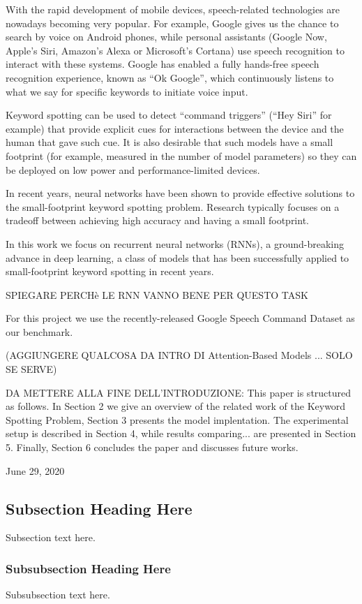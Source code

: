 \documentclass[conference]{IEEEtran}
\begin{document}
With the rapid development of mobile devices, speech-related technologies are nowadays becoming very popular. For example, Google gives us the chance to search by voice on Android phones, while personal assistants (Google Now, Apple’s Siri, Amazon’s Alexa or Microsoft’s Cortana) use speech recognition to interact with these systems. Google has enabled a fully hands-free speech recognition experience, known as “Ok Google”, which continuously listens to what we say for specific keywords to initiate voice input. 

Keyword spotting can be used to detect “command triggers” (“Hey Siri” for example) that provide explicit cues for interactions between the device and the human that gave such cue. It is also desirable that such models have a small footprint (for example, measured in the number of model parameters) so they can be deployed on low power and performance-limited devices. 

In recent years, neural networks have been shown to provide effective solutions to the small-footprint keyword spotting problem. Research typically focuses on a tradeoff between achieving high accuracy and having a small footprint.

In this work we focus on recurrent neural networks (RNNs), a ground-breaking advance in deep learning, a class of models that has been successfully applied to small-footprint keyword spotting in recent years.

SPIEGARE PERCHè LE RNN VANNO BENE PER QUESTO TASK

For this project we use the recently-released Google Speech Command Dataset as our benchmark.

(AGGIUNGERE QUALCOSA DA INTRO DI Attention-Based Models ... SOLO SE SERVE)

DA METTERE ALLA FINE DELL'INTRODUZIONE: This paper is structured as follows. In Section 2 we give an overview of the related work of the Keyword Spotting Problem, Section 3 presents the model implentation. The experimental setup is described in Section 4, while results comparing... are presented in Section 5. Finally, Section 6 concludes the paper and discusses future works.

\hfill June 29, 2020

\subsection{Subsection Heading Here}
Subsection text here.


\subsubsection{Subsubsection Heading Here}
Subsubsection text here.
\end{document}

